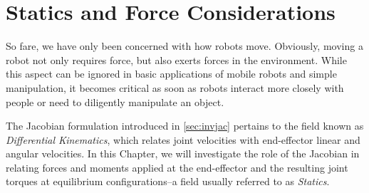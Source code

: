 \chapter{Statics and Force Considerations}
\label{ch:forces}

So fare, we have only been concerned with how robots move. Obviously, moving a robot not only requires force, but also exerts forces in the environment. While this aspect can be ignored in basic applications of mobile robots and simple manipulation, it becomes critical as soon as robots interact more closely with people or need to diligently manipulate an object.

The Jacobian formulation introduced in \cref{sec:invjac} pertains to the field known as \emph{Differential Kinematics}, which relates joint velocities with end-effector linear and angular velocities. 
In this Chapter, we will investigate the role of the Jacobian in relating forces and moments applied at the end-effector and the resulting joint torques at equilibrium configurations--a field usually referred to as \emph{Statics}.



